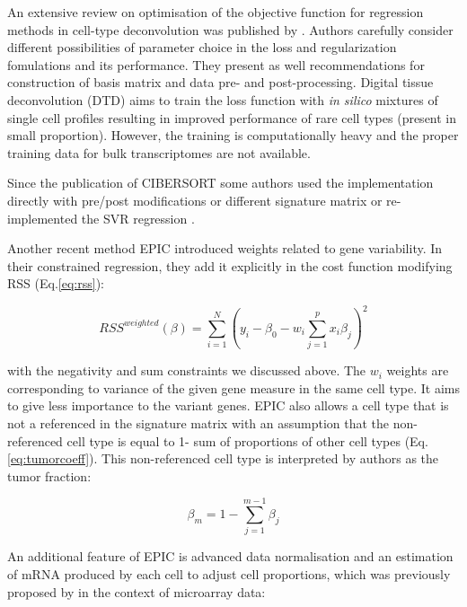 \documentclass[12pt,]{book}
\theoremstyle{definition}
\theoremstyle{definition}
\theoremstyle{definition}
\theoremstyle{remark}
\begin{document}
An extensive review on optimisation of the objective function for
regression methods in cell-type deconvolution was published by
\citet{Mohammadi2017}. Authors carefully consider different
possibilities of parameter choice in the loss and regularization
fomulations and its performance. They present as well recommendations
for construction of basis matrix and data pre- and post-processing.
Digital tissue deconvolution (DTD) \citep{Gortler2018} aims to train the
loss function with \emph{in silico} mixtures of single cell profiles
resulting in improved performance of rare cell types (present in small
proportion). However, the training is computationally heavy and the
proper training data for bulk transcriptomes are not available.

Since the publication of CIBERSORT \citep{Newman2015} some authors
\citep{Chen2018, Schelker2017} used the \citet{Newman2015}
implementation directly with pre/post modifications or different
signature matrix or re-implemented the SVR regression \citep{Chen2018}.

Another recent method EPIC \citep{Racle2017} introduced weights related
to gene variability. In their constrained regression, they add it
explicitly in the cost function modifying RSS (Eq.\eqref{eq:rss}):

\begin{equation}
RSS^{weighted} (\beta) = \sum_{i = 1}^{N}(y_i - \beta_0 - w_i \sum_{j=1}^p x_i\beta_j)^2  \label{eq:epic}
\end{equation}

with the negativity and sum constraints we discussed above. The \(w_i\)
weights are corresponding to variance of the given gene measure in the
same cell type. It aims to give less importance to the variant genes.
EPIC also allows a cell type that is not a referenced in the signature
matrix with an assumption that the non-referenced cell type is equal to
1- sum of proportions of other cell types (Eq.\eqref{eq:tumorcoeff}). This
non-referenced cell type is interpreted by authors as the tumor
fraction:

\begin{equation}
\beta_m = 1 - \sum_{j=1}^{m-1}\beta_j \label{eq:tumorcoeff}
\end{equation}

An additional feature of EPIC is advanced data normalisation and an
estimation of mRNA produced by each cell to adjust cell proportions,
which was previously proposed by \citet{Liebner2014} in the context of
microarray data:
\end{document}
